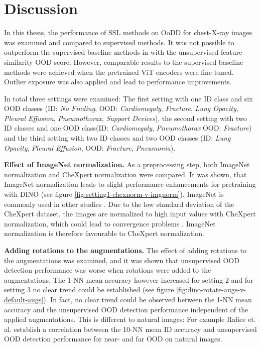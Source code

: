\section{Discussion}
\label{section: discussion}
In this thesis, the performance of SSL methods on OoDD for chest-X-ray images was examined and compared to supervised methods.
It was not possible to outperform the supervised baseline methods in \citep{Berger2021} with the unsupervised feature similarity OOD score.
However, comparable results to the supervised baseline methods were achieved when the pretrained ViT encoders were fine-tuned.
Outlier exposure was also applied and lead to performance improvements.
\par
In total three settings were examined:
The first setting with one ID class and six OOD classes (ID: \textit{No Finding}, OOD: \textit{Cardiomegaly}, \textit{Fracture}, \textit{Lung Opacity}, \textit{Pleural Effusion}, \textit{Pneumothorax}, \textit{Support Devices}), the second setting with two ID classes and one OOD class(ID: \textit{Cardiomegaly}, \textit{Pneumothorax} OOD: \textit{Fracture}) and the third setting with two ID classes and two OOD classes (ID: \textit{Lung Opacity}, \textit{Pleural Effusion}, OOD: \textit{Fracture}, \textit{Pneumonia}).
\par
\textbf{Effect of ImageNet normalization.} As a preprocessing step, both ImageNet normalization and CheXpert normalization were compared.
It was shown, that ImageNet normalization leads to slight performance enhancements for pretraining with DINO (see figure \ref{fig:setting1-chexnorm-v-imgnorm}).
ImageNet is commonly used in other studies \citep{Azizi2021,Pham2020}.
Due to the low standard deviation of the CheXpert dataset, the images are normalized to high input values with CheXpert normalization, which could lead to convergence problems \citep{Lecun2002, He2015, Santurkar2019}.
ImageNet normalization is therefore favourable to CheXpert normalization.
\par
\textbf{Adding rotations to the augmentations.}
The effect of adding rotations to the augmentations was examined, and it was shown that unsupervised OOD detection performance was worse when rotations were added to the augmentations.
The 1-NN mean accuracy however increased for setting 2 and for setting 3 no clear trend could be established (see figure \ref{fig:dino-rotate-augs-v-default-augs}).
In fact, no clear trend could be observed between the 1-NN mean accuracy and the unsupervised OOD detection performance independent of the applied augmentations.
This is different to natural images: For example Rafiee et. al. \citep{Rafiee2022} establish a correlation between the 10-NN mean ID accuracy and unsupervised OOD detection performance for near- and far OOD on natural images.
